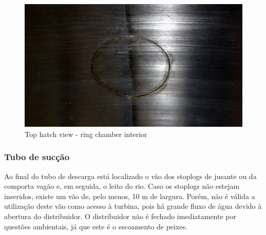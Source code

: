 \begin{figure}[h!]	
	\includegraphics[width=\columnwidth]{figs/viagem/2015_04_28/UG/img_4982}
	\caption{Top hatch view - ring chamber interior}
	\label{fig::esc_sup_int}
\end{figure}

\subsubsection{Tubo de sucção}

Ao final do tubo de descarga está localizado o vão dos stoplogs 
de jusante ou da comporta vagão e, em seguida, o leito do rio. Caso os stoplogs 
não estejam inseridos, existe um vão de, pelo menos, 10 m de largura. Porém, não
é válida a utilização deste vão como acesso à turbina, pois há grande fluxo de
água devido à abertura do distribuidor. O distribuidor não é fechado
imediatamente por questões ambientais, já que este é o escoamento de peixes.



